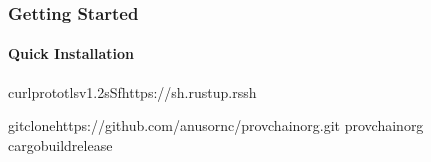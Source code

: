 \documentclass[letterpaper,10pt,english]{sphinxmanual}
\begin{document}
\subsubsection{Getting Started}
\label{\detokenize{foundational/intro-to-provchainorg:getting-started}}

\paragraph{Quick Installation}
\label{\detokenize{foundational/intro-to-provchainorg:quick-installation}}
\begin{sphinxVerbatim}[commandchars=\\\{\}]
curl\PYGZhy{}\PYGZhy{}proto\PYGZhy{}\PYGZhy{}tlsv1.2\PYGZhy{}sSfhttps://sh.rustup.rssh

gitclonehttps://github.com/anusornc/provchain\PYGZhy{}org.git
provchain\PYGZhy{}org
cargobuild\PYGZhy{}\PYGZhy{}release
\end{sphinxVerbatim}
\end{document}
